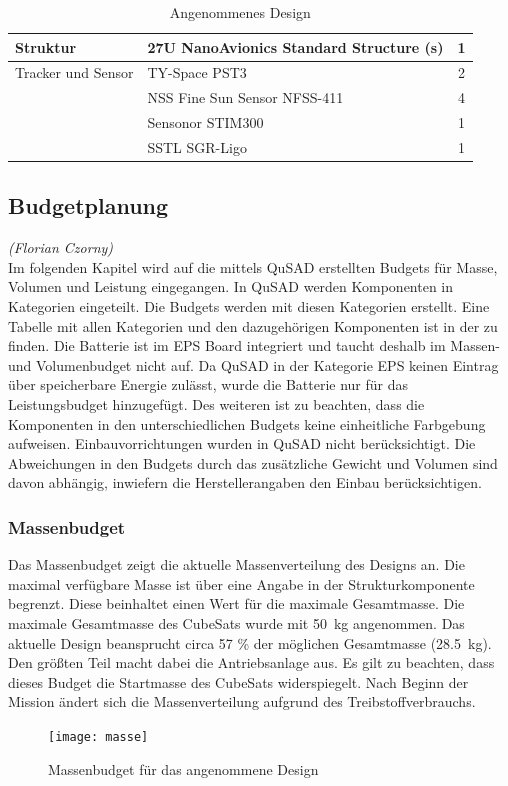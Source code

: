 \begin{table}[H]
\begin{tabular}{|l|l|c|}
Struktur                        & 27U NanoAvionics Standard Structure (s)       & 1      \\ \hline
Tracker und Sensor               & TY-Space PST3                                 & 2      \\ \hline
                                & NSS Fine Sun Sensor NFSS-411                  & 4      \\ \hline
                                & Sensonor STIM300                              & 1      \\ \hline
                                & SSTL SGR-Ligo                                 & 1      \\ \hline
\end{tabular}
\caption{Angenommenes Design \cite{Lettau.}}
\label{tab:cubesatdesign}
\end{table}
	
				\subsection{Budgetplanung}
				\hfill\emph{(Florian Czorny)}\\
Im folgenden Kapitel wird auf die mittels QuSAD erstellten Budgets für Masse, Volumen und Leistung eingegangen. In QuSAD werden Komponenten in Kategorien eingeteilt. Die Budgets werden mit diesen Kategorien erstellt. Eine Tabelle mit allen Kategorien und den dazugehörigen Komponenten ist in der  zu finden. Die Batterie ist im EPS Board integriert und taucht deshalb im Massen- und Volumenbudget nicht auf. Da QuSAD in der Kategorie EPS keinen Eintrag über speicherbare Energie zulässt, wurde die Batterie nur für das Leistungsbudget hinzugefügt. Des weiteren ist zu beachten, dass die Komponenten in den unterschiedlichen Budgets keine einheitliche Farbgebung aufweisen. Einbauvorrichtungen wurden in QuSAD nicht berücksichtigt. Die Abweichungen in den Budgets durch das  zusätzliche Gewicht und Volumen sind davon abhängig, inwiefern die Herstellerangaben den Einbau berücksichtigen.

						\subsubsection{Massenbudget}
Das Massenbudget  zeigt die aktuelle Massenverteilung des Designs an. Die maximal verfügbare Masse ist über eine Angabe in der Strukturkomponente begrenzt. Diese beinhaltet einen Wert für die maximale Gesamtmasse. Die maximale Gesamtmasse des CubeSats wurde mit \SI{50}{\kilogram} angenommen. Das aktuelle Design beansprucht circa \num{57} \% der möglichen Gesamtmasse (\SI{28,5}{\kilogram}). Den größten Teil macht dabei die Antriebsanlage aus. Es gilt zu beachten, dass dieses Budget die Startmasse des CubeSats widerspiegelt. Nach Beginn der Mission ändert sich die Massenverteilung aufgrund des Treibstoffverbrauchs.
										\begin{figure}[H]
											\centering
												\texttt{[image: masse]}
											\caption{Massenbudget für das angenommene Design}
											\label{fig:masse}
										\end{figure}
								

